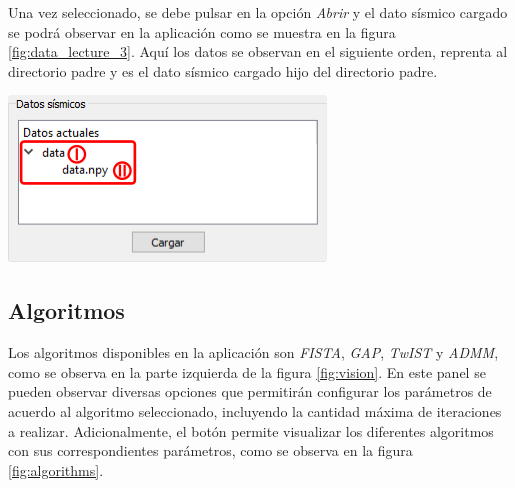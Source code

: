 \documentclass[12pt,oneside,a4]{ol-softwaremanual}
\newcommand*\circled[1]{\tikz[baseline=(char.base)]{
            \node[shape=circle,draw,inner sep=2pt] (char) {#1};}}
\newenvironment{Figure}
  {\par\medskip\noindent\minipage{\linewidth}}
  {\endminipage\par\medskip}
\begin{document}
\begin{multicols}{2}

Una vez seleccionado, se debe pulsar en la opción \emph{Abrir} y el dato sísmico cargado se podrá observar en la aplicación como se muestra en la figura \ref{fig:data_lecture_3}. Aquí los datos se observan en el siguiente orden, \circled{I} reprenta al directorio padre y \circled{II} es el dato sísmico cargado hijo del directorio padre.

\begin{Figure}
    \centering
    \includegraphics[width=0.7\linewidth]{data-lecture-3.png}
    \label{fig:data_lecture_3}
\end{Figure}

\end{multicols}

\subsection{Algoritmos}

Los algoritmos disponibles en la aplicación son \emph{FISTA}, \emph{GAP}, \emph{TwIST} y \emph{ADMM}, como se observa en la parte izquierda \circled{3} de la figura \ref{fig:vision}. En este panel se pueden observar diversas opciones que permitirán configurar los parámetros de acuerdo al algoritmo seleccionado, incluyendo la cantidad máxima de iteraciones a realizar. Adicionalmente, el botón \hspace{0.5mm} \faEye \hspace{0.5mm} permite visualizar los diferentes algoritmos con sus correspondientes parámetros, como se observa en la figura \ref{fig:algorithms}.
\end{document}

